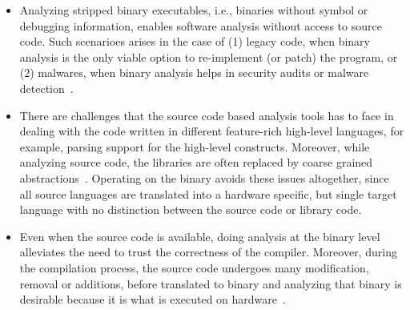 \begin{itemize}
    
    \item Analyzing stripped binary executables, i.e., binaries without symbol
    or debugging information, enables software analysis without access to
    source code. Such scenarioes arises in the case of (1) legacy code, when
    binary analysis is the only viable option to re-implement (or patch) the
    program, or (2) malwares, when binary analysis helps in security audits or
    malware
    detection~\cite{Christodorescu:2005,Andreas2007,Kinder:2005,Kinder:2010,Kolbitsch:2009}.
    
    \item There are challenges that the source code based analysis tools has to
    face  in dealing with the code written in different feature-rich high-level
    languages, for example, parsing support for  the high-level constructs.
    Moreover, while analyzing source code, the libraries are often replaced by
    coarse grained abstractions~\cite{libabs}. Operating on the binary avoids
    these issues altogether, since all source languages are translated into a
    hardware specific, but single target language with no distinction between
    the source code or library code. 
    
    \item Even when the source code is available, doing analysis at the binary
    level alleviates the need to trust the correctness of the compiler.
    Moreover, during the compilation process, the source code undergoes many
    modification, removal or additions, before translated to binary and
    analyzing that binary is desirable because it is what is executed on
    hardware~\cite{WYSINWYE}. 
\end{itemize}

